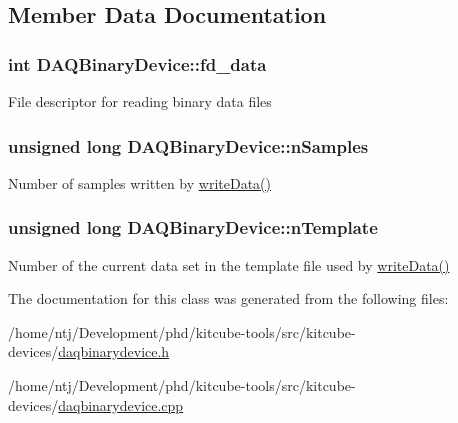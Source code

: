 \subsection{Member Data Documentation}
\hypertarget{classDAQBinaryDevice_a561f25e67b72d217b904a104175f0bfd}{
\subsubsection[{fd\-\_\-data}]{\setlength{\rightskip}{0pt plus 5cm}int D\-A\-Q\-Binary\-Device\-::fd\-\_\-data\hspace{0.3cm}{\ttfamily [protected]}}}\label{classDAQBinaryDevice_a561f25e67b72d217b904a104175f0bfd}
File descriptor for reading binary data files \hypertarget{classDAQBinaryDevice_a8eac27c83c30772d1260fda3acbde4be}{
\subsubsection[{n\-Samples}]{\setlength{\rightskip}{0pt plus 5cm}unsigned long D\-A\-Q\-Binary\-Device\-::n\-Samples\hspace{0.3cm}{\ttfamily [protected]}}}\label{classDAQBinaryDevice_a8eac27c83c30772d1260fda3acbde4be}
Number of samples written by \hyperlink{classDAQBinaryDevice_aa438886ea601984abdf2daf0f4e72543}{write\-Data()} \hypertarget{classDAQBinaryDevice_a50f33c0714edaf6468affc7200229978}{
\subsubsection[{n\-Template}]{\setlength{\rightskip}{0pt plus 5cm}unsigned long D\-A\-Q\-Binary\-Device\-::n\-Template\hspace{0.3cm}{\ttfamily [protected]}}}\label{classDAQBinaryDevice_a50f33c0714edaf6468affc7200229978}
Number of the current data set in the template file used by \hyperlink{classDAQBinaryDevice_aa438886ea601984abdf2daf0f4e72543}{write\-Data()} 

The documentation for this class was generated from the following files\-:\begin{DoxyCompactItemize}
\item 
/home/ntj/\-Development/phd/kitcube-\/tools/src/kitcube-\/devices/\hyperlink{daqbinarydevice_8h}{daqbinarydevice.\-h}\item 
/home/ntj/\-Development/phd/kitcube-\/tools/src/kitcube-\/devices/\hyperlink{daqbinarydevice_8cpp}{daqbinarydevice.\-cpp}\end{DoxyCompactItemize}
